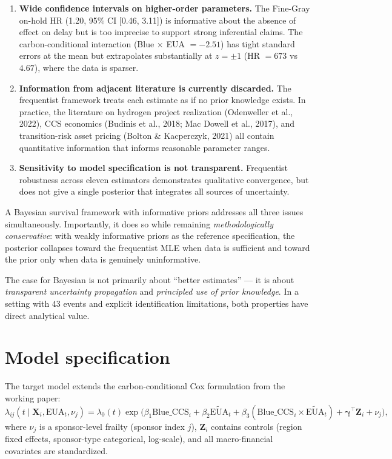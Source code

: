 \documentclass[11pt,a4paper]{article}
\newcommand{\BlueCCS}{\mathrm{Blue\_CCS}}
\newcommand{\EUA}{\mathrm{EUA}}
\begin{document}
\begin{enumerate}
  \item \textbf{Wide confidence intervals on higher-order parameters.} The Fine-Gray on-hold HR (1.20, 95\% CI [0.46, 3.11]) is informative about the absence of effect on delay but is too imprecise to support strong inferential claims. The carbon-conditional interaction (Blue $\times$ EUA $= -2.51$) has tight standard errors at the mean but extrapolates substantially at $z = \pm 1$ (HR $= 673$ vs $4.67$), where the data is sparser.
  \item \textbf{Information from adjacent literature is currently discarded.} The frequentist framework treats each estimate as if no prior knowledge exists. In practice, the literature on hydrogen project realization (Odenweller et al., 2022), CCS economics (Budinis et al., 2018; Mac Dowell et al., 2017), and transition-risk asset pricing (Bolton \& Kacperczyk, 2021) all contain quantitative information that informs reasonable parameter ranges.
  \item \textbf{Sensitivity to model specification is not transparent.} Frequentist robustness across eleven estimators demonstrates qualitative convergence, but does not give a single posterior that integrates all sources of uncertainty.
\end{enumerate}

A Bayesian survival framework with informative priors addresses all three issues simultaneously. Importantly, it does so while remaining \emph{methodologically conservative}: with weakly informative priors as the reference specification, the posterior collapses toward the frequentist MLE when data is sufficient and toward the prior only when data is genuinely uninformative.

\begin{rationale}
The case for Bayesian is not primarily about ``better estimates'' --- it is about \emph{transparent uncertainty propagation} and \emph{principled use of prior knowledge}. In a setting with 43 events and explicit identification limitations, both properties have direct analytical value.
\end{rationale}

\section{Model specification}

The target model extends the carbon-conditional Cox formulation from the working paper:
\[
\lambda_{ij}(t \mid \bm{X}_i, \EUA_t, \nu_j) =
\lambda_0(t)
\exp\!\bigl(\beta_1 \BlueCCS_i + \beta_2 \widetilde{\EUA}_t + \beta_3 (\BlueCCS_i \times \widetilde{\EUA}_t) + \bm{\gamma}^\top \bm{Z}_i + \nu_j \bigr),
\]
where $\nu_j$ is a sponsor-level frailty (sponsor index $j$), $\bm{Z}_i$ contains controls (region fixed effects, sponsor-type categorical, log-scale), and all macro-financial covariates are standardized.
\end{document}
